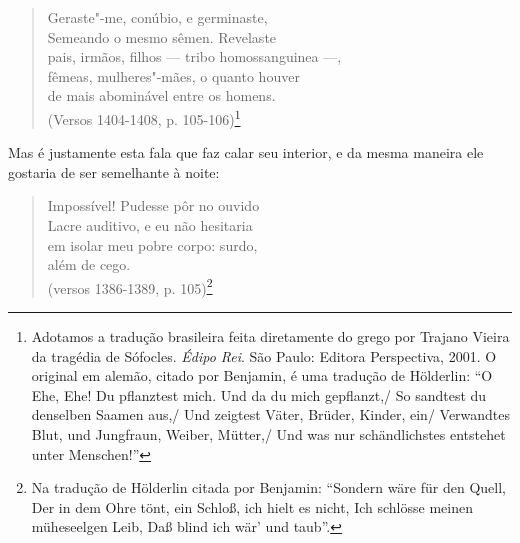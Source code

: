 \begin{verse}
Geraste"-me, conúbio, e germinaste,\\
Semeando o mesmo sêmen. Revelaste\\
pais, irmãos, filhos \qb{}--- tribo homossanguinea ---,\\
fêmeas, mulheres"-mães, o quanto houver\\
de mais abominável entre os homens.\\
(Versos 1404-1408, p. 105-106)\footnote{Adotamos a tradução
  brasileira feita diretamente do grego por Trajano Vieira da tragédia
  de Sófocles. \emph{Édipo Rei}. São Paulo: Editora Perspectiva, 2001. O
  original em alemão, citado por Benjamin, é uma tradução de Hölderlin:
  ``O Ehe, Ehe! Du pflanztest mich. Und da du mich gepflanzt,/
  So sandtest du denselben Saamen aus,/
  Und zeigtest Väter, Brüder, Kinder, ein/
  Verwandtes Blut, und Jungfraun, Weiber, Mütter,/
  Und was nur schändlichstes entstehet unter Menschen!'' \versal{[N. T.]}}
\end{verse}

Mas é justamente esta fala que faz calar seu interior, e da mesma maneira ele
gostaria de ser semelhante à noite:

\begin{verse}
Impossível! Pudesse pôr no ouvido\\
Lacre auditivo, e eu não hesitaria\\
em isolar meu pobre corpo: surdo,\\
além de cego.\\
(versos 1386-1389, p. 105)\footnote{Na tradução de Hölderlin
  citada por Benjamin: ``Sondern wäre für den Quell, Der in dem Ohre
  tönt, ein Schloß, ich hielt es nicht, Ich schlösse meinen müheseelgen
  Leib, Daß blind ich wär' und taub''. \versal{[N. T.]}}
\end{verse}

